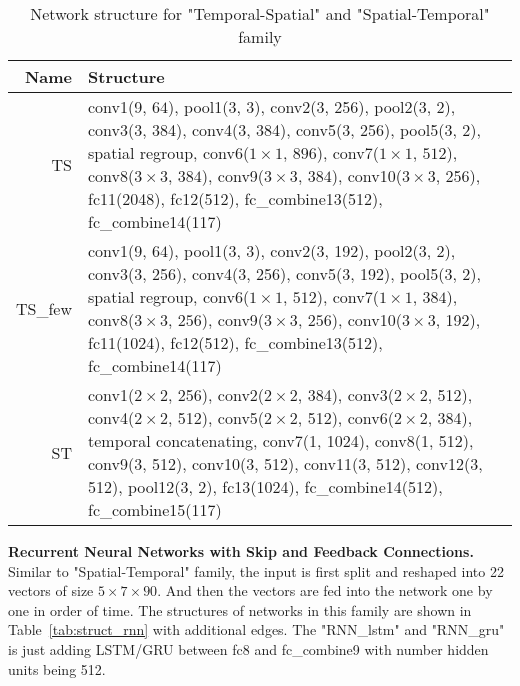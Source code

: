 \begin{table}[h]
\caption{Network structure for "Temporal-Spatial" and "Spatial-Temporal" family} %
\centering %
\begin{tabularx}{\textwidth}{r|X}
\hline\hline
Name & Structure \\ [0.5ex]
\hline
TS & conv1(9, $64$), pool1(3, 3), conv2(3, 256), pool2(3, 2), conv3(3, 384), conv4(3, 384), conv5(3, 256), pool5(3, 2), spatial regroup, conv6($1\times1$, $896$), conv7($1\times1$, $512$), conv8($3\times3$, $384$), conv9($3\times3$, $384$), conv10($3\times3$, 256), fc11(2048), fc12(512), fc\_combine13(512), fc\_combine14(117)\\
\hline
TS\_few & conv1(9, $64$), pool1(3, 3), conv2(3, 192), pool2(3, 2), conv3(3, 256), conv4(3, 256), conv5(3, 192), pool5(3, 2), spatial regroup, conv6($1\times1$, $512$), conv7($1\times1$, $384$), conv8($3\times3$, $256$), conv9($3\times3$, $256$), conv10($3\times3$, 192), fc11(1024), fc12(512), fc\_combine13(512), fc\_combine14(117)\\
\hline\hline
ST & conv1($2\times2$, 256), conv2($2\times2$, 384), conv3($2\times2$, 512), conv4($2\times2$, 512), conv5($2\times2$, 512), conv6($2\times2$, 384), temporal concatenating, conv7(1, 1024), conv8(1, 512), conv9(3, 512), conv10(3, 512), conv11(3, 512), conv12(3, 512), pool12(3, 2), fc13(1024), fc\_combine14(512), fc\_combine15(117)\\
\hline
\end{tabularx}
\label{tab:struct_ts_st}
\end{table}

\textbf{Recurrent Neural Networks with Skip and Feedback Connections.} Similar to "Spatial-Temporal" family, the input is first split and reshaped into 22 vectors of size $5\times7\times90$. 
And then the vectors are fed into the network one by one in order of time.
The structures of networks in this family are shown in Table~\ref{tab:struct_rnn} with additional edges.
The "RNN\_lstm" and "RNN\_gru" is just adding LSTM/GRU between fc8 and fc\_combine9 with number hidden units being 512.

